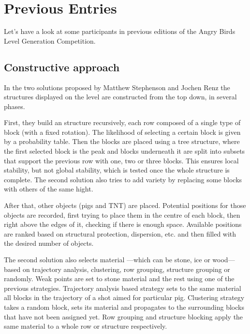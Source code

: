 \chapter{Previous Entries}\label{ch:otherSolutions}
Let's have a look at some participants in previous editions of the Angry Birds Level Generation Competition.

\section{Constructive approach}
In the two solutions proposed by Matthew Stephenson and Jochen Renz \cite{stephenson2017generating} \cite{stephenson2016procedural} the structures displayed on the level are constructed from the top down, in several phases. 

First, they build an structure recursively, each row composed of a single type of block (with a fixed rotation). The likelihood of selecting a certain block is given by a probability table. Then the blocks are placed using a tree structure, where the first selected block is the peak and blocks underneath it are split into subsets that support the previous row with one, two or three blocks. This ensures local stability, but not global stability, which is tested once the whole structure is complete. The second solution also tries to add variety by replacing some blocks with others of the same hight.

After that, other objects (pigs and TNT) are placed. Potential positions for those objects are recorded, first trying to place them in the centre of each block, then right above the edges of it, checking if there is enough space. Available positions are ranked based on structural protection, dispersion, etc. and then filled with the desired number of objects.

The second solution also selects material ---which can be stone, ice or wood--- based on trajectory analysis, clustering, row grouping, structure grouping or randomly. Weak points are set to stone material and the rest using one of the previous strategies. Trajectory analysis based strategy sets to the same material all blocks in the trajectory of a shot aimed for particular pig. Clustering strategy takes a random block, sets its material and propagates to the surrounding blocks that have not been assigned yet. Row grouping and structure blocking apply the same material to a whole row or structure respectively.

